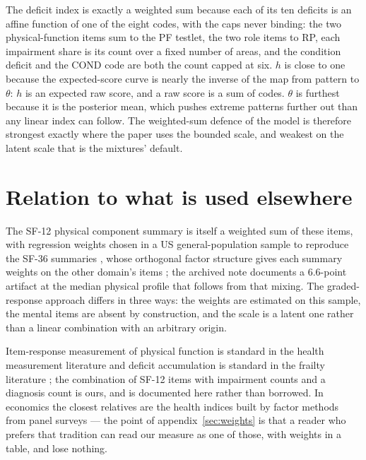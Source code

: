 \documentclass[11pt]{article}
\begin{document}
The deficit index is exactly a weighted sum because each of its ten deficits is an
affine function of one of the eight codes, with the caps never binding: the
two physical-function items sum to the {PF} testlet, the two role items to {RP},
each impairment share is its count over a fixed number of areas, and the
condition deficit and the {COND} code are both the count capped at six. $h$ is
close to one because the expected-score curve is nearly the inverse of the map
from pattern to $\theta$: $h$ is an expected raw score, and a raw score is a sum
of codes. $\theta$ is furthest because it is the posterior mean, which pushes
extreme patterns further out than any linear index can follow. The weighted-sum
defence of the model is therefore strongest exactly where the paper uses the
bounded scale, and weakest on the latent scale that is the mixtures' default.

\section{Relation to what is used elsewhere}

The SF-12 physical component summary is itself a weighted sum of these items,
with regression weights chosen in a US general-population sample to reproduce the SF-36
summaries \citep{ware1996}, whose orthogonal factor structure gives each summary weights
on the other domain's items \citep{farivar2007}; the archived note documents a 6.6-point artifact at the
median physical profile that follows from that mixing. The graded-response
approach differs in three ways: the weights are estimated on this sample, the
mental items are absent by construction, and the scale is a latent one rather
than a linear combination with an arbitrary origin.

Item-response measurement of physical function is standard in the health
measurement literature \citep[PROMIS physical function;][]{cella2010} and
deficit accumulation is standard in the frailty literature \citep{mitnitski2001,searle2008}; the combination of
SF-12 items with impairment counts and a diagnosis count is ours, and is
documented here rather than borrowed. In economics the closest relatives are
the health indices built by factor methods from panel surveys --- the point of
appendix~\ref{sec:weights} is that a reader who prefers that tradition can read
our measure as one of those, with weights in a table, and lose nothing.



\end{document}
